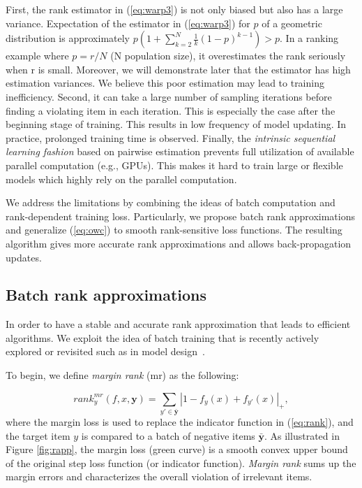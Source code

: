\documentclass[letterpaper]{article}
\begin{document}
First, the rank estimator in (\ref{eq:warp3}) is not only biased but also has a large variance. Expectation of the estimator in (\ref{eq:warp3}) for $p$ of a geometric distribution is approximately $p (1+ \sum_{k=2}^N \frac{1}{k} (1-p)^{k-1}) > p$. In a ranking example where $p = r / N$ (N population size), it overestimates the rank seriously when r is small. Moreover, we will demonstrate later that the estimator has high estimation variances. We believe this poor estimation may lead to training inefficiency. %
Second, it can take a large number of sampling iterations before finding a violating item in each iteration. This is especially the case after the beginning stage of training. This results in low frequency of model updating. In practice, prolonged training time is observed.
Finally, the \textit{intrinsic sequential learning fashion} based on pairwise estimation prevents full utilization of available parallel computation (e.g., GPUs). This makes it hard to train large or flexible models which highly rely on the parallel computation.



We address the limitations by combining the ideas of batch computation and rank-dependent training loss. Particularly, we propose batch rank approximations and generalize (\ref{eq:owc}) to smooth rank-sensitive loss functions. The resulting algorithm gives more accurate rank approximations and allows back-propagation updates.


\subsection{Batch rank approximations}

In order to have a stable and accurate rank approximation that leads to efficient algorithms. We exploit the idea of batch training that is recently actively explored or revisited such as in model design~\cite{covington2016deep}.%

To begin, we define \textit{margin rank} (mr) as the following:

\begin{equation}
\label{eq:mr}
rank^{mr}_y(f,x,\textbf{y}) =\sum_{y'\in \bar{\textbf{y}} } |1-f_y(x) + f_{y'}(x)|_+, %
\end{equation}
where the margin loss is used to replace the indicator function in (\ref{eq:rank}), and the target item $y$ is compared to a batch of negative items $\bar{\textbf{y}}$.
As illustrated in Figure \ref{fig:rapp}, the margin loss (green curve) is a smooth convex upper bound of the original step loss function (or indicator function). \textit{Margin rank} sums up the margin errors and characterizes the overall violation of irrelevant items.
\end{document}
